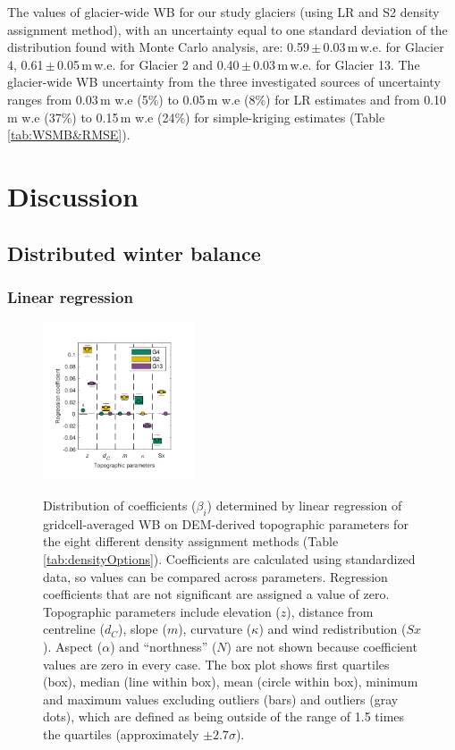 \documentclass[twocolumn, letterpaper]{igs}
\begin{document}
The values of glacier-wide WB for our study glaciers (using LR and S2 density assignment method), with an uncertainty equal to one standard deviation of the distribution found with Monte Carlo analysis, are: 0.59\,$\pm$\,0.03\,m\,w.e. for Glacier 4, 0.61\,$\pm$\,0.05\,m\,w.e. for Glacier 2 and 0.40\,$\pm$\,0.03\,m\,w.e. for Glacier 13. The glacier-wide WB uncertainty from the three investigated sources of uncertainty ranges from 0.03\,m w.e (5\%) to 0.05\,m w.e (8\%) for LR estimates and from 0.10\,m w.e (37\%) to 0.15\,m w.e (24\%) for simple-kriging estimates (Table \ref{tab:WSMB&RMSE}).

\section{Discussion}

\subsection{Distributed winter balance}

\subsubsection{Linear regression}

\begin{figure}
	\centering
	\includegraphics[width =0.4\textwidth]{BetaCoeffs.pdf}\\
	\caption{Distribution of coefficients ($\beta_i$) determined by linear regression of gridcell-averaged WB on DEM-derived topographic parameters for the eight different density assignment methods (Table \ref{tab:densityOptions}). Coefficients are calculated using standardized data, so values can be compared across parameters. Regression coefficients that are not significant are assigned a value of zero. Topographic parameters include elevation ($z$), distance from centreline ($d_C$), slope ($m$), curvature ($\kappa$) and wind redistribution ($Sx$).  Aspect ($\alpha$) and ``northness'' ($N$) are not shown because coefficient values are zero in every case. The box plot shows first quartiles (box), median (line within box), mean (circle within box), minimum and maximum values excluding outliers (bars) and outliers (gray dots), which are defined as being outside of the range of 1.5 times the quartiles (approximately $\pm2.7\sigma$). }
	\label{fig:BetaCoeffs}
\end{figure}
\end{document}
